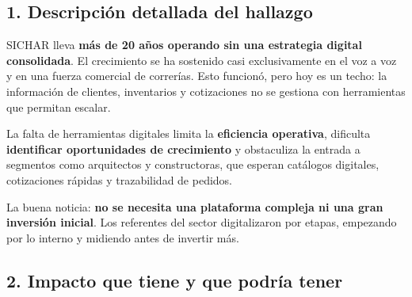 \documentclass[11pt,a4paper]{article}
\begin{document}

\hypertarget{descripciuxf3n-detallada-del-hallazgo-3}{%
\subsection*{1. Descripción detallada del hallazgo}\label{descripciuxf3n-detallada-del-hallazgo-3}}

SICHAR lleva \textbf{más de 20 años operando sin una estrategia digital consolidada}. El crecimiento
se ha sostenido casi exclusivamente en el voz a voz y en una fuerza comercial de correrías. Esto
funcionó, pero hoy es un techo: la información de clientes, inventarios y cotizaciones no se
gestiona con herramientas que permitan escalar.

La falta de herramientas digitales limita la \textbf{eficiencia operativa}, dificulta
\textbf{identificar oportunidades de crecimiento} y obstaculiza la entrada a segmentos como
arquitectos y constructoras, que esperan catálogos digitales, cotizaciones rápidas y trazabilidad de
pedidos.

La buena noticia: \textbf{no se necesita una plataforma compleja ni una gran inversión inicial}. Los
referentes del sector digitalizaron por etapas, empezando por lo interno y midiendo antes de
invertir más.


\hypertarget{impacto-que-tiene-y-que-podruxeda-tener-3}{%
\subsection*{2. Impacto que tiene y que podría
tener}\label{impacto-que-tiene-y-que-podruxeda-tener-3}}
\end{document}
